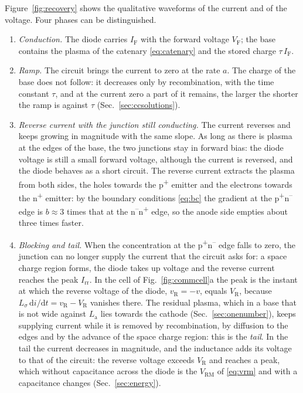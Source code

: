 \documentclass[10pt,a4paper]{scrartcl}
\newcommand{\IF}{I_\mathrm{F}}
\newcommand{\VR}{V_\mathrm{R}}
\newcommand{\VF}{V_\mathrm{F}}
\newcommand{\Irr}{I_\mathrm{rr}}
\newcommand{\Vrm}{V_\mathrm{RM}}
\newcommand{\diff}{\mathrm{d}}
\newcommand{\Ls}{L_\sigma}                    %
\newcommand{\La}{L_\mathrm{a}}
\newcommand{\Pp}{p\textsuperscript{+}}
\newcommand{\Nm}{n\textsuperscript{--}}
\newcommand{\Np}{n\textsuperscript{+}}
\begin{document}
Figure~\ref{fig:recovery} shows the qualitative waveforms of the current and of the voltage. Four phases can be distinguished.
\begin{enumerate}
\item \emph{Conduction.} The diode carries $\IF$ with the forward voltage $\VF$; the base contains the plasma of the catenary \eqref{eq:catenary} and the stored charge $\tau\,\IF$.
\item \emph{Ramp.} The circuit brings the current to zero at the rate $a$. The charge of the base does not follow: it decreases only by recombination, with the time constant $\tau$, and at the current zero a part of it remains, the larger the shorter the ramp is against $\tau$ (Sec.~\ref{sec:ccsolutions}).
\item \emph{Reverse current with the junction still conducting.} The current reverses and keeps growing in magnitude with the same slope. As long as there is plasma at the edges of the base, the two junctions stay in forward bias: the diode voltage is still a small forward voltage, although the current is reversed, and the diode behaves as a short circuit. The reverse current extracts the plasma from both sides, the holes towards the \Pp{} emitter and the electrons towards the \Np{} emitter: by the boundary conditions \eqref{eq:bc} the gradient at the \Pp\Nm{} edge is $b \approx 3$ times that at the \Nm\Np{} edge, so the anode side empties about three times faster.
\item \emph{Blocking and tail.} When the concentration at the \Pp\Nm{} edge falls to zero, the junction can no longer supply the current that the circuit asks for: a space charge region forms, the diode takes up voltage and the reverse current reaches the peak $\Irr$. In the cell of Fig.~\ref{fig:commcell}a the peak is the instant at which the reverse voltage of the diode, $v_\mathrm{R} = -v$, equals $\VR$, because $\Ls\,\diff i/\diff t = v_\mathrm{R} - \VR$ vanishes there. The residual plasma, which in a base that is not wide against $\La$ lies towards the cathode (Sec.~\ref{sec:onenumber}), keeps supplying current while it is removed by recombination, by diffusion to the edges and by the advance of the space charge region: this is the \emph{tail}. In the tail the current decreases in magnitude, and the inductance adds its voltage to that of the circuit: the reverse voltage exceeds $\VR$ and reaches a peak, which without capacitance across the diode is the $\Vrm$ of \eqref{eq:vrm} and with a capacitance changes (Sec.~\ref{sec:energy}).
\end{enumerate}
\end{document}

